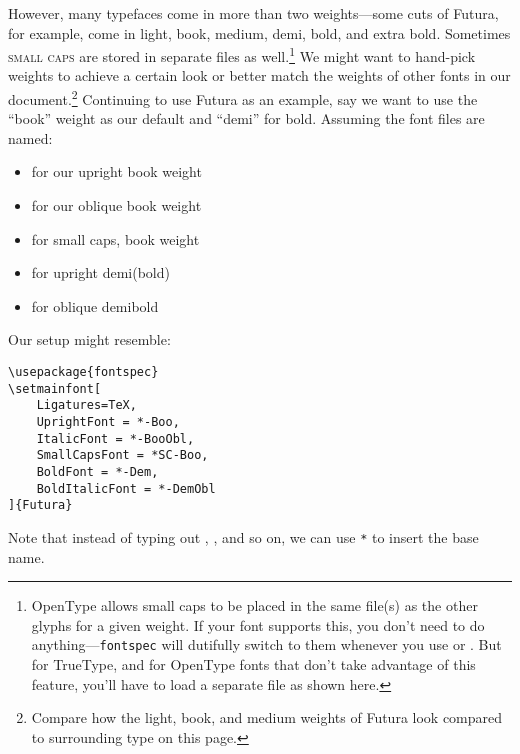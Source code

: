 However, many typefaces come in more than two weights---some cuts of Futura,
for example, come in
{light},
{book},
{medium},
{demi},
{bold}, and
{extra bold}.
Sometimes
{\textsc{small caps}}
are stored in separate files as well.\punckern\footnote{OpenType allows
small caps to be placed in the same file(s) as the other glyphs for a given
weight.
If your font supports this, you don't need to do anything---\texttt{fontspec}
will dutifully switch to them whenever you use
 or .
But for TrueType, and for OpenType fonts that don't take advantage of this
feature, you'll have to load a separate file as shown here.}
We might want to hand-pick weights to achieve a certain look or better match the
weights of other fonts in our document.\punckern\footnote{Compare how
{the light,}
{book,}
{and medium weights}
of Futura look compared to surrounding type on this page.}
Continuing to use Futura as an example,
say we want to use the ``book'' weight as our default
and ``demi'' for bold.
Assuming the font files are named:
\begin{itemize}
\item {} for our
    {upright book weight}
\item {} for our
    {oblique book weight}
\item {} for
    {small caps, book weight}
\item {} for
    {upright demi(bold)}
\item {} for
    {oblique demibold}
\end{itemize}

\noindent Our setup might resemble:
\begin{leftfigure}
\begin{lstlisting}
\usepackage{fontspec}
\setmainfont[
    Ligatures=TeX,
    UprightFont = *-Boo,
    ItalicFont = *-BooObl,
    SmallCapsFont = *SC-Boo,
    BoldFont = *-Dem,
    BoldItalicFont = *-DemObl
]{Futura}
\end{lstlisting}
\end{leftfigure}
Note that instead of typing out ,
, and so on, we can use \texttt{*} to insert the base name.

